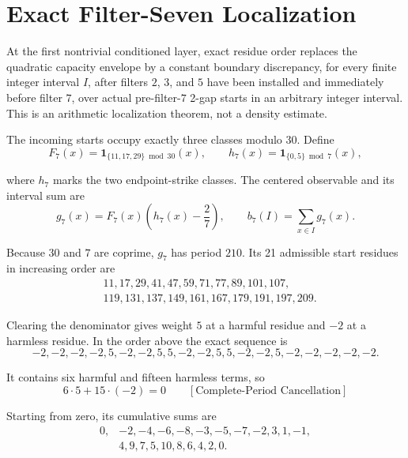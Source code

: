 \section{Exact Filter-Seven Localization}
\label{sec:exact-filter-seven-localization}

At the first nontrivial conditioned layer, exact residue order replaces the
quadratic capacity envelope by a constant boundary discrepancy, for every
finite integer interval $I$, after filters $2$, $3$, and $5$ have been
installed and immediately before filter $7$, over actual pre-filter-$7$
2-gap starts in an arbitrary integer interval. This is an arithmetic
localization theorem, not a density estimate.

The incoming starts occupy exactly three classes modulo $30$. Define
\begin{equation*}
F_7(x)=\mathbf1_{\{11,17,29\}\bmod30}(x),
\qquad
h_7(x)=\mathbf1_{\{0,5\}\bmod7}(x),
\end{equation*}

where $h_7$ marks the two endpoint-strike classes. The centered observable and
its interval sum are
\begin{equation*}
g_7(x)=F_7(x)\left(h_7(x)-\frac27\right),
\qquad
b_7(I)=\sum_{x\in I}g_7(x).
\end{equation*}

Because $30$ and $7$ are coprime, $g_7$ has period $210$. Its 21 admissible
start residues in increasing order are
\begin{equation*}
\begin{aligned}
&11,17,29,41,47,59,71,77,89,101,107,\\
&119,131,137,149,161,167,179,191,197,209.
\end{aligned}
\end{equation*}

Clearing the denominator gives weight $5$ at a harmful residue and $-2$ at a
harmless residue. In the order above the exact sequence is
\begin{equation*}
-2,-2,-2,-2,5,-2,-2,5,5,-2,-2,5,5,-2,-2,5,-2,-2,-2,-2,-2.
\end{equation*}

It contains six harmful and fifteen harmless terms, so
\begin{equation*}
6\cdot5+15\cdot(-2)=0
\qquad[\text{Complete-Period Cancellation}]
\end{equation*}

Starting from zero, its cumulative sums are
\begin{equation*}
\begin{aligned}
0,&-2,-4,-6,-8,-3,-5,-7,-2,3,1,-1,\\
&4,9,7,5,10,8,6,4,2,0.
\end{aligned}
\end{equation*}

